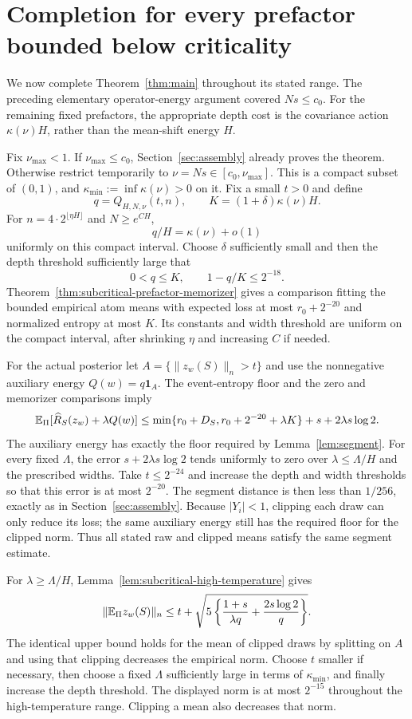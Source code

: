 \section{Completion for every prefactor bounded below criticality}
\label{sec:all-subcritical-prefactors}
We now complete Theorem~\ref{thm:main} throughout its stated range. The preceding elementary operator-energy argument covered $Ns\le c_0$. For the remaining fixed prefactors, the appropriate depth cost is the covariance action $\kappa(\nu)H$, rather than the mean-shift energy $H$.

Fix $\nu_{\max}<1$. If $\nu_{\max}\le c_0$, Section~\ref{sec:assembly} already proves the theorem. Otherwise restrict temporarily to $\nu=Ns\in[c_0,\nu_{\max}]$. This is a compact subset of $(0,1)$, and $\kappa_{\min}:=\inf\kappa(\nu)>0$ on it. Fix a small $t>0$ and define
\[
 q=Q_{H,N,\nu}(t,n),\qquad K=(1+\delta)\kappa(\nu)H.
\]
For $n=4\cdot2^{\lfloor\eta H\rfloor}$ and $N\ge e^{CH}$,
\[
 q/H=\kappa(\nu)+o(1)
\]
uniformly on this compact interval. Choose $\delta$ sufficiently small and then the depth threshold sufficiently large that
\[
 0<q\le K,\qquad 1-q/K\le2^{-18}.
\]
Theorem~\ref{thm:subcritical-prefactor-memorizer} gives a comparison fitting the bounded empirical atom means with expected loss at most $r_0+2^{-20}$ and normalized entropy at most $K$. Its constants and width threshold are uniform on the compact interval, after shrinking $\eta$ and increasing $C$ if needed.

For the actual posterior let $A=\{\|z_w(S)\|_n>t\}$ and use the nonnegative auxiliary energy $Q(w)=q\mathbf1_A$. The event-entropy floor and the zero and memorizer comparisons imply
\[
 \mathbb E_\Pi[\widehat R_S(z_w)+\lambda Q(w)]
 \le\min\{r_0+D_S,r_0+2^{-20}+\lambda K\}
                       +s+2\lambda s\log2.
\]
The auxiliary energy has exactly the floor required by Lemma~\ref{lem:segment}. For every fixed $\Lambda$, the error $s+2\lambda s\log2$ tends uniformly to zero over $\lambda\le\Lambda/H$ and the prescribed widths. Take $t\le2^{-24}$ and increase the depth and width thresholds so that this error is at most $2^{-20}$. The segment distance is then less than $1/256$, exactly as in Section~\ref{sec:assembly}. Because $|Y_i|<1$, clipping each draw can only reduce its loss; the same auxiliary energy still has the required floor for the clipped norm. Thus all stated raw and clipped means satisfy the same segment estimate.

For $\lambda\ge\Lambda/H$, Lemma~\ref{lem:subcritical-high-temperature} gives
\[
 \|\mathbb E_\Pi z_w(S)\|_n\le t+
 \sqrt{5\left\{\frac{1+s}{\lambda q}+\frac{2s\log2}{q}\right\}}.
\]
The identical upper bound holds for the mean of clipped draws by splitting on $A$ and using that clipping decreases the empirical norm. Choose $t$ smaller if necessary, then choose a fixed $\Lambda$ sufficiently large in terms of $\kappa_{\min}$, and finally increase the depth threshold. The displayed norm is at most $2^{-15}$ throughout the high-temperature range. Clipping a mean also decreases that norm.

